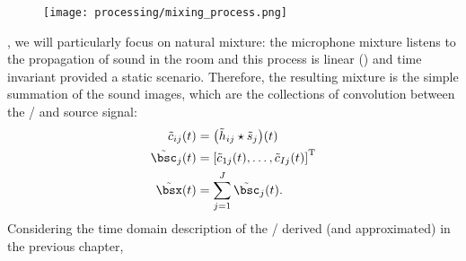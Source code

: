 \begin{figure}[t]
    \begin{fullwidthfig}
        \texttt{[image: processing/mixing\_process.png]}
    \end{fullwidthfig}

    \vspace{-\baselineskip}\vspace{-\baselineskip}
    \label{fig:processing:mixing}
\end{figure}

, we will particularly focus on natural mixture:
the microphone mixture listens to the propagation of sound in the room and this process is linear () and time invariant provided a static scenario.
Therefore, the resulting mixture is the simple summation of the sound images,
which are the collections of convolution between the \RIRs/ and source signal:
\begin{align}
    \tilde{\img}_{\idxMic\idxSrc}(t) &= \kparen{\tilde{\rir}_{\idxMic\idxSrc} \convCont \tilde{\src}_\idxSrc} (t)     \label{eq:processing:mixing:img} \\
    \tilde{\imgs}_\idxSrc(t)         &= \ktranspose{\klist{\tilde{\img}_{1\idxSrc}(t), \dots, \tilde{\img}_{\numMics\idxSrc}(t)}} \nonumber\\
    \tilde{\mics}(t)                 &= \sum_{\idxSrc=1}^{\numSrcs} \tilde{\imgs}_\idxSrc(t)                    \label{eq:processing:mixing:mix}
    .
\end{align}%
Considering the time domain description of the \RIR/ derived (and approximated) in the previous chapter,
